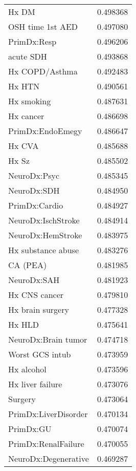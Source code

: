 \begin{tabular}{lr}
Hx DM                          &  0.498368 \\
OSH time 1st AED               &  0.497080 \\
PrimDx:Resp                    &  0.496206 \\
acute SDH                      &  0.493868 \\
Hx COPD/Asthma                 &  0.492483 \\
Hx HTN                         &  0.490561 \\
Hx smoking                     &  0.487631 \\
Hx cancer                      &  0.486698 \\
PrimDx:EndoEmegy               &  0.486647 \\
Hx CVA                         &  0.485688 \\
Hx Sz                          &  0.485502 \\
NeuroDx:Psyc                   &  0.485345 \\
NeuroDx:SDH                    &  0.484950 \\
PrimDx:Cardio                  &  0.484927 \\
NeuroDx:IschStroke             &  0.484914 \\
NeuroDx:HemStroke              &  0.483975 \\
Hx substance abuse             &  0.483276 \\
CA (PEA)                       &  0.481985 \\
NeuroDx:SAH                    &  0.481923 \\
Hx CNS cancer                  &  0.479810 \\
Hx brain surgery               &  0.477328 \\
Hx HLD                         &  0.475641 \\
NeuroDx:Brain tumor            &  0.474718 \\
Worst GCS intub                &  0.473959 \\
Hx alcohol                     &  0.473596 \\
Hx liver failure               &  0.473076 \\
Surgery                        &  0.473064 \\
PrimDx:LiverDisorder           &  0.470134 \\
PrimDx:GU                      &  0.470074 \\
PrimDx:RenalFailure            &  0.470055 \\
NeuroDx:Degenerative           &  0.469287 \\

\end{tabular}
